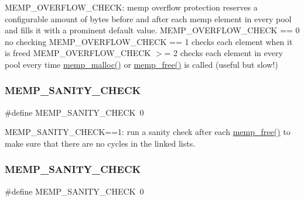 M\+E\+M\+P\+\_\+\+O\+V\+E\+R\+F\+L\+O\+W\+\_\+\+C\+H\+E\+CK\+: memp overflow protection reserves a configurable amount of bytes before and after each memp element in every pool and fills it with a prominent default value. M\+E\+M\+P\+\_\+\+O\+V\+E\+R\+F\+L\+O\+W\+\_\+\+C\+H\+E\+CK == 0 no checking M\+E\+M\+P\+\_\+\+O\+V\+E\+R\+F\+L\+O\+W\+\_\+\+C\+H\+E\+CK == 1 checks each element when it is freed M\+E\+M\+P\+\_\+\+O\+V\+E\+R\+F\+L\+O\+W\+\_\+\+C\+H\+E\+CK $>$= 2 checks each element in every pool every time \hyperlink{native_2lwip_2src_2core_2memp_8c_a2b00593d086313c267b54a976bf67aa5}{memp\+\_\+malloc()} or \hyperlink{native_2lwip_2src_2core_2memp_8c_aecd94926b7c2a0e23ae195f4ae97581f}{memp\+\_\+free()} is called (useful but slow!) \mbox{\label{group__lwip__opts__mem_ga0838947193e222a9f46b582e01e5beff}} 
\subsubsection{\texorpdfstring{M\+E\+M\+P\+\_\+\+S\+A\+N\+I\+T\+Y\+\_\+\+C\+H\+E\+CK}{MEMP\_SANITY\_CHECK}\hspace{0.1cm}{\footnotesize\ttfamily [1/2]}}
{\footnotesize\ttfamily \#define M\+E\+M\+P\+\_\+\+S\+A\+N\+I\+T\+Y\+\_\+\+C\+H\+E\+CK~0}

M\+E\+M\+P\+\_\+\+S\+A\+N\+I\+T\+Y\+\_\+\+C\+H\+E\+CK==1\+: run a sanity check after each \hyperlink{native_2lwip_2src_2core_2memp_8c_aecd94926b7c2a0e23ae195f4ae97581f}{memp\+\_\+free()} to make sure that there are no cycles in the linked lists. \mbox{\label{group__lwip__opts__mem_ga0838947193e222a9f46b582e01e5beff}} 
\subsubsection{\texorpdfstring{M\+E\+M\+P\+\_\+\+S\+A\+N\+I\+T\+Y\+\_\+\+C\+H\+E\+CK}{MEMP\_SANITY\_CHECK}\hspace{0.1cm}{\footnotesize\ttfamily [2/2]}}
{\footnotesize\ttfamily \#define M\+E\+M\+P\+\_\+\+S\+A\+N\+I\+T\+Y\+\_\+\+C\+H\+E\+CK~0}

